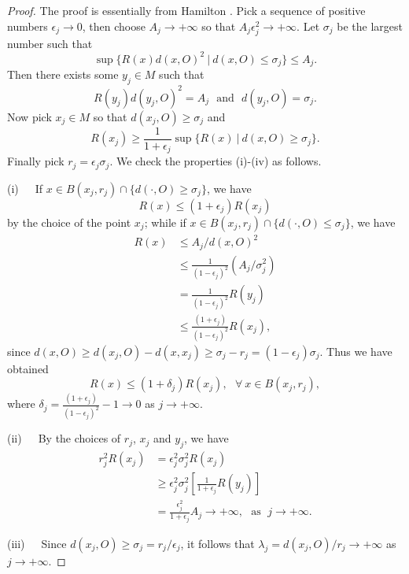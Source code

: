 \begin{proof} The proof is essentially from Hamilton \cite{Ha95F}.
Pick a sequence of positive numbers $\epsilon_j\rightarrow0$, then
choose $A_j\rightarrow+\infty$ so that
$A_j\epsilon^2_j\rightarrow+\infty$. Let $\sigma_j$ be the largest
number such that
$$
\sup\{ R(x)d(x,O)^2\ |\ d(x,O)\leq\sigma_j\}\leq A_j.
$$
Then there exists some $y_j\in M$ such that
$$
R(y_j)d(y_j,O)^2=A_j\ \ \ \mbox{and}\ \ \ d(y_j,O)=\sigma_j.
$$
Now pick $x_j\in M$ so that $d(x_j,O)\geq\sigma_j$ and
$$
R(x_j)\geq\frac{1}{1+\epsilon_j}\sup\{ R(x)\ |\
d(x,O)\geq\sigma_j\}.
$$
Finally pick $r_j=\epsilon_j\sigma_j$. We check the properties
(i)-(iv) as follows.

\smallskip
(i)\ \ \ If $x\in B(x_j,r_j)\cap\{d(\cdot,O)\geq\sigma_j\}$, we
have
$$
R(x)\leq(1+\epsilon_j)R(x_j)
$$
by the choice of the point $x_j$; while if $x\in
B(x_j,r_j)\cap\{d(\cdot,O)\leq\sigma_j\}$, we have
\begin{displaymath}
\begin{split}
   R(x)&\leq A_j/d(x,O)^2\\[1mm]
       &\leq \frac{1}{(1-\epsilon_j)^2}(A_j/\sigma_j^2)\\[1mm]
       &=  \frac{1}{(1-\epsilon_j)^2}R(y_j)\\[1mm]
       &\leq \frac{(1+\epsilon_j)}{(1-\epsilon_j)^2}R(x_j),
\end{split}
\end{displaymath}
since $d(x,O)\geq
d(x_j,O)-d(x,x_j)\geq\sigma_j-r_j=(1-\epsilon_j)\sigma_j$. Thus we
have obtained
$$
R(x)\leq(1+\delta_j)R(x_j),\ \ \ \forall\ x\in B(x_j,r_j),
$$
where
$\delta_j=\frac{(1+\epsilon_j)}{(1-\epsilon_j)^2}-1\rightarrow0$
as $j\rightarrow+\infty$.

\smallskip
(ii)\ \ \ By the choices of $r_j$, $x_j$ and $y_j$, we have
\begin{displaymath}
\begin{split}
r^2_jR(x_j)&= \epsilon_j^2\sigma_j^2R(x_j)\\[1mm]
      &\geq \epsilon_j^2\sigma_j^2
\left[\frac{1}{1+\epsilon_j}R(y_j)\right]\\[1mm]
      &= \frac{\epsilon_j^2}{1+\epsilon_j}A_j\rightarrow+\infty,\
      \ \ \mbox{as }\; j\rightarrow+\infty.
\end{split}
\end{displaymath}

\smallskip
(iii)\ \ \ Since $d(x_j,O)\geq\sigma_j={r_j}/{\epsilon_j}$, it
follows that $\lambda_j={d(x_j,O)}/{r_j}\rightarrow+\infty$ as
$j\rightarrow+\infty$.


\end{proof}
